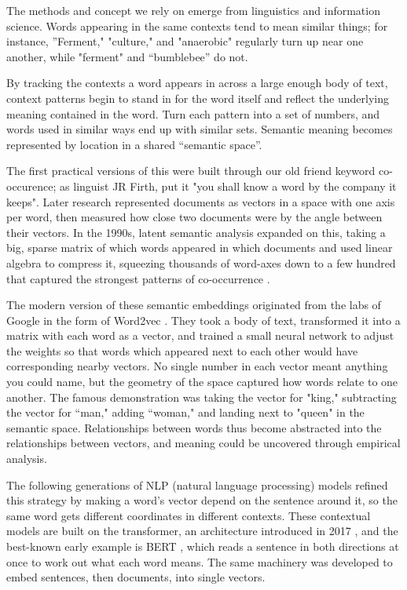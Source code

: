 \documentclass[12pt,a4paper]{article}
\begin{document}
	The methods and concept we rely on emerge from linguistics and information science. Words appearing in the same contexts tend to mean similar things; for instance, ”Ferment," "culture," and "anaerobic" regularly turn up near one another, while "ferment" and “bumblebee” do not. 
	
	By tracking the contexts a word appears in across a large enough body of text, context patterns begin to stand in for the word itself and reflect the underlying meaning contained in the word. Turn each pattern into a set of numbers, and words used in similar ways end up with similar sets. Semantic meaning becomes represented by location in a shared “semantic space”.
	
	The first practical versions of this were built through our old friend keyword co-occurence; as linguist JR Firth, put it "you shall know a word by the company it keeps"\parencite{firthSynopsisLinguisticTheory1957}. Later research represented documents as vectors in a space with one axis per word, then measured how close two documents were by the angle between their vectors. In the 1990s, latent semantic analysis expanded on this, taking a big, sparse matrix of which words appeared in which documents and used linear algebra to compress it, squeezing thousands of word-axes down to a few hundred that captured the strongest patterns of co-occurrence \parencite{deerwesterIndexingLatentSemantic1990}. 
	
	The modern version of these semantic embeddings originated from the labs of Google in the form of Word2vec \parencite{mikolovEfficientEstimationWord2013}. They took a body of text, transformed it into a matrix with each word as a vector, and trained a small neural network to adjust the weights so that words which appeared next to each other would have corresponding nearby vectors. No single number in each vector meant anything you could name, but the geometry of the space captured how words relate to one another. The famous demonstration was taking the vector for "king," subtracting the vector for “man," adding “woman," and landing next to "queen" in the semantic space. Relationships between words thus become abstracted into the relationships between vectors, and meaning could be uncovered through empirical analysis.
	
	The following generations of NLP (natural language processing) models refined this strategy by making a word's vector depend on the sentence around it, so the same word gets different coordinates in different contexts. These contextual models are built on the transformer, an architecture introduced in 2017 \parencite{vaswaniAttentionAllYou2017}, and the best-known early example is BERT \parencite{devlinBERTPretrainingDeep2019}, which reads a sentence in both directions at once to work out what each word means. The same machinery was developed to embed sentences, then documents, into single vectors.
	
\end{document}
